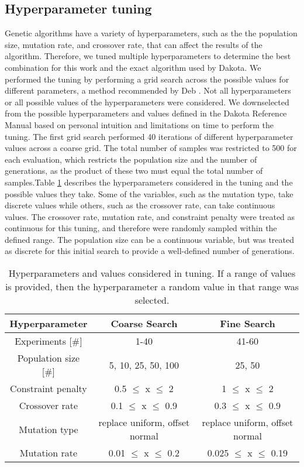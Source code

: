 \subsection{Hyperparameter tuning}
Genetic algorithms have a variety of hyperparameters, such as the the 
population size, mutation rate, and crossover rate, that can affect 
the results of the algorithm. Therefore, we tuned multiple hyperparameters
to determine the best combination for this work and the exact algorithm 
used by Dakota. We performed the tuning by performing a grid search across 
the possible values for different parameters, a method recommended 
by Deb \cite{deb_multi-objective_2001}. Not all hyperparameters or 
all possible values of the hyperparameters were considered. We downselected from 
the possible hyperparameters and values defined in the Dakota Reference 
Manual based on personal intuition and limitations on time to perform 
the tuning. The 
first grid search performed 40 iterations of different hyperparameter 
values across a coarse grid. The total number of samples was restricted to 
500 for each evaluation, which restricts the population size and the 
number of generations, as the product of these two must equal the 
total number of samples.Table \ref{tab:soga_tuning} describes 
the hyperparameters considered in the tuning and the possible 
values they take. Some of the variables, such as the mutation 
type, take discrete values while others, such as the crossover 
rate, can take continuous values. The crossover rate, mutation 
rate, and constraint penalty were treated as continuous for this 
tuning, and therefore were randomly sampled within the defined range. 
The population size can be a continuous variable, but was 
treated as discrete for this initial search to provide a well-defined 
number of generations.

\begin{table}
    \centering 
    \caption{Hyperparameters and values considered in tuning. If a range 
    of values is provided, then the hyperparameter a random value in 
    that range was selected.}
    \label{tab:soga_tuning}
    \begin{tabular}{c c c}
        \hline
        Hyperparameter & Coarse Search & Fine Search \\
        \hline 
        Experiments [\#] & 1-40 & 41-60 \\
        Population size [\#] & 5, 10, 25, 50, 100 & 25, 50\\
        Constraint penalty & 0.5 $\leq$ x $\leq$ 2 & 1 $\leq$ x $\leq$ 2\\
        Crossover rate & 0.1 $\leq$ x $\leq$ 0.9 & 0.3 $\leq$ x $\leq$ 0.9\\
        Mutation type & replace uniform, offset normal & replace uniform, offset normal\\
        Mutation rate & 0.01 $\leq$ x $\leq$ 0.2 & 0.025 $\leq$ x $\leq$ 0.19\\
        \hline       
    \end{tabular}
\end{table}


